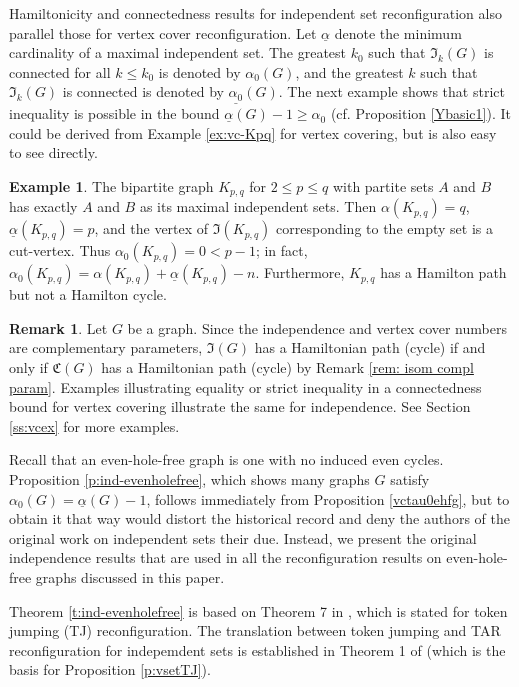 \documentclass{article}
\numberwithin{figure}{section}
\numberwithin{table}{section}
\numberwithin{equation}{section}
\theoremstyle{definition}
\newtheorem{rem}[thm]{Remark}
\theoremstyle{definition}
\theoremstyle{definition}
\newtheorem{ex}[thm]{Example}
\newcommand{\ibar}{\underline{\alpha}}
\newcommand{\vctar}{\mathfrak{C}}%
\newcommand{\itar}{\mathfrak{I}}%
\newcommand{\io}{\alpha_0}
\newcommand{\ulio}{\underline{\alpha_0}}
\begin{document}
{Hamiltonicity and connectedness results for independent set reconfiguration also parallel those for vertex cover reconfiguration. 
 Let $\ibar$ denote the minimum cardinality of a maximal independent set.  
  The greatest $k_0$ such that $\itar_k(G)$ is connected for all $k\le k_0$ is denoted by $\io(G)$, and the greatest $k$ such that $\itar_k(G)$ is connected is denoted by $\ulio(G)$.  
The next example shows that strict inequality is possible in the bound $\ibar(G)-1\ge \alpha_0$ (cf. Proposition \ref{Ybasic1}). It could be derived from Example \ref{ex:vc-Kpq} for vertex covering, but is also easy to see directly.

\begin{ex}
    The bipartite graph $K_{p,q}$ for $2 \leq p \leq q$ with partite sets $A$ and $B$ has  exactly $A$ and $B$ as its maximal independent sets. Then $\alpha(K_{p,q})=q$, $\ibar(K_{p,q})=p$, and the vertex of $\itar(K_{p,q})$ corresponding to the empty set is a cut-vertex. Thus $\alpha_0(K_{p,q})=0 <p-1$; in fact, $\alpha_0(K_{p,q})=\alpha(K_{p,q})+\ibar(K_{p,q})-n$.  Furthermore, $K_{p,q}$ has a  Hamilton path %
    but not a Hamilton cycle. %
\end{ex}

\begin{rem} Let $G$ be  a graph. Since the independence and vertex cover numbers are complementary parameters, $\itar(G)$ has a Hamiltonian path (cycle) if and only if $\vctar(G)$ has a Hamiltonian path (cycle) by Remark \ref{rem: isom compl param}. Examples illustrating equality or strict inequality in a connectedness bound for vertex covering illustrate the same for independence. See Section \ref{ss:vcex} for more examples.
\end{rem}

 

 Recall that an even-hole-free graph is one with no induced even cycles. 
 Proposition \ref{p:ind-evenholefree}, which shows many graphs $G$ satisfy $\alpha_0(G)=\ibar(G)-1$,  follows immediately from Proposition \ref{vctau0ehfg}, but to obtain it that way would distort the historical record and deny the authors of the original work on independent sets their due. Instead, we present the original independence results that are used in all the reconfiguration results on even-hole-free graphs discussed in this paper.  

  Theorem \ref{t:ind-evenholefree} is based on Theorem 7 in \cite{KMM12}, which is stated   for token jumping (TJ) reconfiguration. The translation between token jumping and TAR reconfiguration for indepemdent sets is established in Theorem 1 of \cite{KMM12} (which is the basis for Proposition \ref{p:vsetTJ}).
 

}
\end{document}

